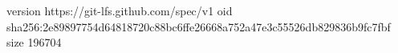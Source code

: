 version https://git-lfs.github.com/spec/v1
oid sha256:2e89897754d64818720c88bc6ffe26668a752a47e3c55526db829836b9fc7fbf
size 196704
